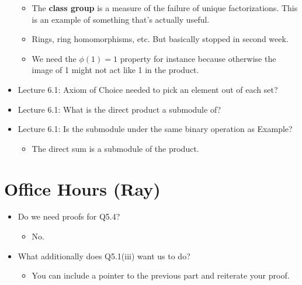 \documentclass[../notes.tex]{subfiles}
\begin{document}
\begin{itemize}
\begin{itemize}
        \item The \textbf{class group} is a measure of the failure of unique factorizations. This is an example of something that's actually useful.
        \item Rings, ring homomorphisms, etc. But basically stopped in second week.
        \item We need the $\phi(1)=1$ property for instance because otherwise the image of 1 might not act like 1 in the product.
    \end{itemize}
    \item Lecture 6.1: Axiom of Choice needed to pick an element out of each set?
    \item Lecture 6.1: What is the direct product a submodule of?
    \item Lecture 6.1: Is the submodule under the same binary operation as Example?
    \begin{itemize}
        \item The direct sum is a submodule of the product.
    \end{itemize}
\end{itemize}



\section{Office Hours (Ray)}
\begin{itemize}
    \item Do we need proofs for Q5.4?
    \begin{itemize}
        \item No.
    \end{itemize}
    \item What additionally does Q5.1(iii) want us to do?
    \begin{itemize}
        \item You can include a pointer to the previous part and reiterate your proof.
    \end{itemize}
\end{itemize}
\end{document}
